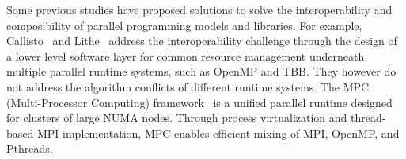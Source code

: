 Some previous studies have proposed solutions to solve the interoperability and composibility of parallel programming models and libraries. 
For example, Callisto~\cite{Callisto:Harris:2014:CCP:2592798.2592807} and
Lithe~\cite{Lithe:Pan:2009:LEE:1855591.1855602} 
address the interoperability challenge 
through the design of a lower level software layer for common 
resource management underneath multiple parallel runtime systems, such as OpenMP and TBB. %
They however do not address the algorithm conflicts of different runtime systems. 
The MPC (Multi-Processor Computing) framework~\cite{perache2008mpc} is a unified parallel runtime designed for clusters of large NUMA nodes. 
Through process virtualization and thread-based MPI implementation, MPC enables efficient mixing of MPI, OpenMP, and Pthreads. 

